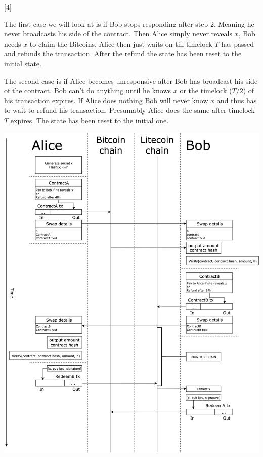 [4]

The first case we will look at is if Bob stops responding after step 2. Meaning he never broadcasts his side of the contract. Then Alice simply never reveals $x$, Bob needs $x$ to claim the Bitcoins. Alice then just waits on till timelock $T$ has passed and refunds the transaction. After the refund the state has been reset to the initial state.

The second case is if Alice becomes unresponsive after Bob has broadcast his side of the contract. Bob can't do anything until he knows $x$ or the timelock ($T/2$) of his transaction expires. If Alice does nothing Bob will never know $x$ and thus has to wait to refund his transaction. Presumably Alice does the same after timelock $T$ expires. The state has been reset to the initial one.

\newpage
\centerline{\includegraphics[width=1.35\textwidth]{background/images/atomic_swap_flow_large.png}}
\newpage


